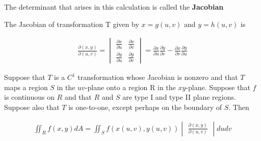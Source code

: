 The determinant that arises in this calculation is called the \textbf{Jacobian}

\begin{definition}
    The Jacobian of transformation T given by $x=g(u, v)$ and $y=h(u, v)$ is
    
    \begin{align*}
    \frac{\partial(x, y)}{\partial (u, v)} = 
     \begin{vmatrix}
        \frac{\partial x}{\partial u} & \frac{\partial x}{\partial v}\\
        \frac{\partial y}{\partial u} & \frac{\partial y}{\partial v}
    \end{vmatrix}
    =
    \frac{\partial x}{\partial u} \frac{\partial y}{\partial v} - \frac{\partial x}{\partial v}\frac{\partial y}{\partial u}
    \end{align*}
\end{definition}

\begin{definition}
    Suppose that $T$ is a $C^1$ transformation whose Jacobian is nonzero and that $T$ maps a region $S$ in the $uv$-plane onto a region R in the $xy$-plane. Suppose that $f$ is continuous on $R$ and that $R$ and $S$ are type I and type II plane regions. Suppose also that $T$ is one-to-one, except perhaps on the boundary of $S$. Then
\end{definition}

\begin{align*}
    \iint_{R} f(x, y)dA = 
    \iint_{S}f(x(u, v), y(u, v))
    \begin{vmatrix}
        \frac{\partial(x, y)}{\partial (u, v)}
    \end{vmatrix}
  dudv
\end{align*}
